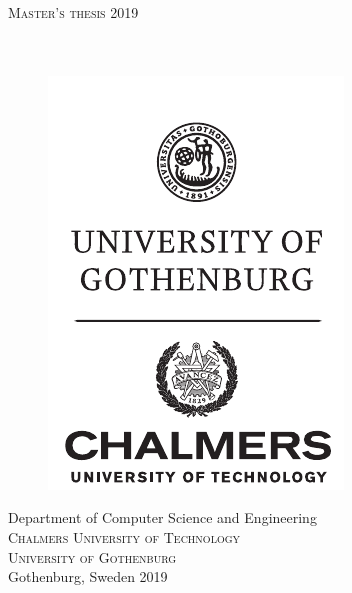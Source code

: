 \newpage
\thispagestyle{empty}
\begin{center}
	\textsc{\large Master's thesis 2019}\\[4cm]
	\textbf{\Large \titleA} \\[1cm]
	{\large \titleB}\\[1cm]
	{\large \me}

	\vfill
	\begin{figure}[H]
	\centering
	\includegraphics[width=0.25\pdfpagewidth]{figure/auxiliary/ChGULogoHog.pdf}
	\end{figure}	\vspace{5mm}

	Department of Computer Science and Engineering\\
	\textsc{Chalmers University of Technology} \\
	\textsc{University of Gothenburg} \\
	Gothenburg, Sweden 2019 \\
\end{center}


\newpage
\thispagestyle{plain}
\vspace*{4.5cm}
\titleA\\
\titleB\\
\me \vspace{1cm}

